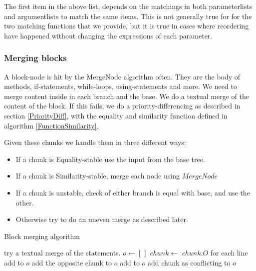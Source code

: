 \documentclass[11pt]{article}
\begin{document}
The first item in the above list, depends on the matchings in both parameterlists and argumentlists to match the same items. This is not generally true for for the two matching functions that we provide, but it is true in cases where reordering have happened without changing the expressions of each parameter.


\subsubsection{Merging blocks}
A block-node is hit by the MergeNode algorithm often. They are the body of methods, if-statements, while-loops, using-statements and more. We need to merge content inside in each branch and the base. We do a textual merge of the content of the block. If this fails, we do a priority-differencing as described in section \ref{PriorityDiff}, with the equality and similarity function defined in algorithm \ref{FunctionSimilarity}.

Given these chunks we handle them in three different ways: 

\begin{itemize}
	\item If a chunk is Equality-stable use the input from the base tree.
	\item If a chunk is Similarity-stable, merge each node using $MergeNode$
	\item If a chunk is unstable, check of either branch is equal with base, and use the other.
	\item Otherwise try to do an uneven merge as described later.
\end{itemize}

\begin{algorithm}
  \caption{Block merging algorithm}
  \label{MergeStatementList}
\begin{algorithmic}
    \State try  a textual merge of the statements.
    	\State $o \gets [\,]$
        \State $chunk \gets $ 
                \State \Return $chunk.O$
                \State for each line add  to $o$
                \State add the opposite chunk to $o$
            \Else
                \State add   to $o$
                	\State add chunk as conflicting to $o$
                \EndIf
            \EndIf
        \EndFor
    \EndIf
\EndFunction
\end{algorithmic}
\end{algorithm}
\end{document}
